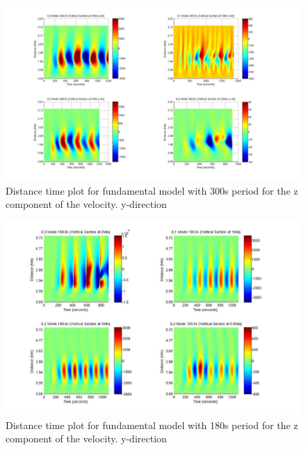 \documentclass[final,1p]{elsarticle}
\begin{document}

\begin{figure}[h]
\includegraphics[scale=0.4]{imagesn/dt_300_vert_y.jpg}
\caption{Distance time plot for fundamental model with 300s period for the z component of the velocity. y-direction }
\end{figure}


\begin{figure}[h]
\includegraphics[scale=0.4]{imagesn/dt_180_vert_y.jpg}
\caption{Distance time plot for fundamental model with 180s period for the z component of the velocity.  y-direction}
\end{figure}
\end{document}
